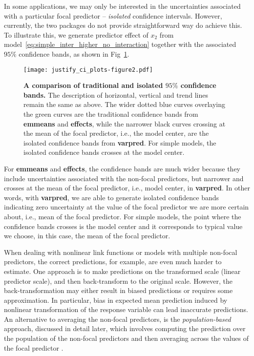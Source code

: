 \documentclass[10pt,letterpaper]{article}
\newcommand{\pkg}[1]{\textbf{#1}}
\begin{document}
In some applications, we may only be interested in the uncertainties associated with a particular focal predictor -- \emph{isolated} confidence intervals. However, currently, the two packages do not provide straightforward way do achieve this. To illustrate this, we generate predictor effect of $x_2$ from model~\ref{eq:simple_inter_higher_no_interaction} together with the associated $95\%$ confidence bands, as shown in Fig~\ref{fig:justify_ci_plots}. 

\begin{figure}[!h]
\centering
\texttt{[image: justify\_ci\_plots-figure2.pdf]}
\caption{{\bf A comparison of traditional and isolated $95\%$ confidence bands.} The description of horizontal, vertical and trend lines remain the same as above. The wider dotted blue curves overlaying the green curves are the traditional confidence bands from \pkg{emmeans} and \pkg{effects}, while the narrower black curves crossing at the mean of the focal predictor, i.e., the model center, are the isolated confidence bands from \pkg{varpred}. For simple models, the isolated confidence bands crosses at the model center.}
\label{fig:justify_ci_plots}
\end{figure}

For \pkg{emmeans} and \pkg{effects}, the confidence bands are much wider because they include uncertainties associated with the non-focal predictors, but narrower and crosses at the mean of the focal predictor, i.e., model center, in \pkg{varpred}. In other words, with \pkg{varpred}, we are able to generate isolated confidence bands indicating zero uncertainty at the value of the focal predictor we are more certain about, i.e., mean of the focal predictor. For simple models, the point where the confidence bands crosses is the model center and it corresponds to typical value we choose, in this case, the mean of the focal predictor.


When dealing with nonlinear link functions or models with multiple non-focal predictors, the correct predictions, for example, are even much harder to estimate. One approach is to make predictions on the transformed scale (linear predictor scale), and then back-transform to the original scale. However, the back-transformation may either result in biased predictions or requires some approximation. In particular, bias in expected mean prediction induced by nonlinear transformation of the response variable can lead inaccurate predictions. An alternative to averaging the non-focal predictors, is the \emph{population-based} approach, discussed in detail later, which involves computing the prediction over the population of the non-focal predictors and then averaging across the values of the focal predictor \cite{hanmer2013behind}. 
\end{document}
